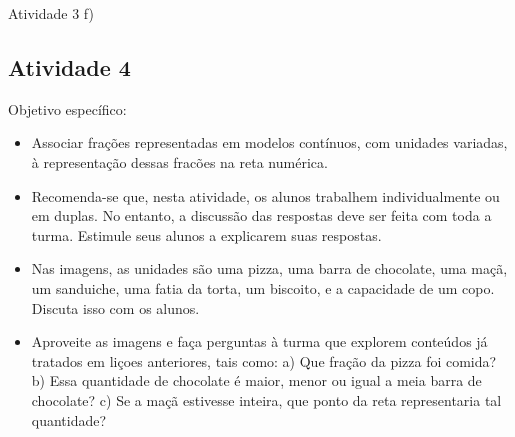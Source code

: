 \begin{multicols}{2}
\begin{resposta*} {Atividade 3}
f)
 
 
\end{resposta*}




\subsection{Atividade 4}
  Objetivo específico:   
\begin{itemize} %
    \item       Associar frações representadas em modelos contínuos, com unidades variadas, à representação dessas fracões na reta numérica.
\end{itemize} %
  
  
\begin{itemize} %
    \item       Recomenda-se que, nesta atividade, os alunos trabalhem individualmente ou em duplas. No entanto, a discussão das respostas deve ser feita com toda a turma. Estimule seus alunos a explicarem suas respostas.
    \item       Nas imagens, as unidades são uma pizza, uma barra de chocolate, uma maçã, um sanduiche, uma fatia da torta, um biscoito, e a capacidade de um copo. Discuta isso com os alunos.
    \item       Aproveite as imagens e faça perguntas à turma que explorem conteúdos já tratados em liçoes anteriores, tais como: a) Que fração da pizza foi comida? b) Essa quantidade de chocolate é maior, menor ou igual a meia barra de chocolate? c) Se a maçã estivesse inteira, que ponto da reta representaria tal quantidade?  
\end{itemize} %


\end{multicols}
